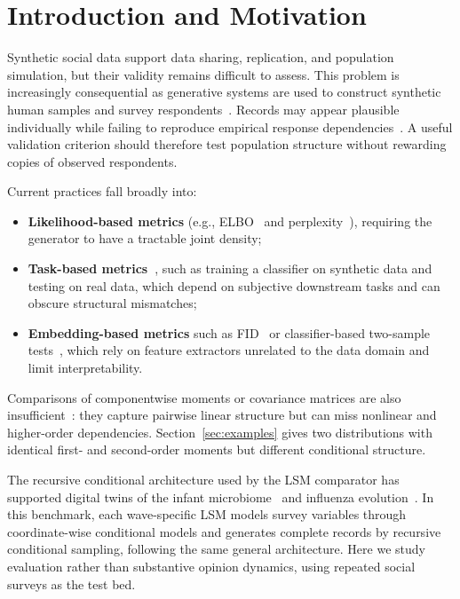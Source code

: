 \documentclass[runningheads]{llncs}
\begin{document}
\section{Introduction and Motivation}
Synthetic social data support data sharing, replication, and population
simulation, but their validity remains difficult to assess. This problem is
increasingly consequential as generative systems are used to construct synthetic
human samples and survey respondents~\cite{argyle2023out,bisbee2024synthetic}.
Records may appear plausible individually while failing to reproduce empirical
response dependencies~\cite{kozlowski2025simulating}. A useful validation
criterion should therefore test population structure without rewarding copies
of observed respondents.

Current practices fall broadly into:
\begin{itemize}
\item \textbf{Likelihood-based metrics} (e.g., ELBO~\cite{kingma2014autoencoding} and perplexity~\cite{jelinek1977perplexity}), requiring the generator to have a tractable joint density;
\item \textbf{Task-based metrics~\cite{esteban2017realvalued}}, such as training a classifier on
      synthetic data and testing on real data, which depend on subjective
      downstream tasks and can obscure structural mismatches;
\item \textbf{Embedding-based metrics} such as FID~\cite{heusel2017gans} or classifier-based
      two-sample tests~\cite{lopezpaz2017revisiting}, which rely on feature extractors unrelated to
      the data domain and  limit interpretability.
\end{itemize}
Comparisons of componentwise moments or covariance matrices are also
insufficient~\cite{snoke2018general,nowok2016synthpop}: they capture pairwise
linear structure but can miss nonlinear and higher-order dependencies.
Section~\ref{sec:examples} gives two distributions with identical first- and
second-order moments but different conditional structure.

The recursive conditional architecture used by the LSM comparator has supported
digital twins of the infant microbiome~\cite{sizemore2024digital} and influenza
evolution~\cite{wu2026emergenet}. In this benchmark, each wave-specific LSM
models survey variables through coordinate-wise conditional models and generates
complete records by recursive conditional sampling, following the same general
architecture. Here we study evaluation rather than substantive opinion dynamics,
using repeated social surveys as the test bed.
\end{document}
